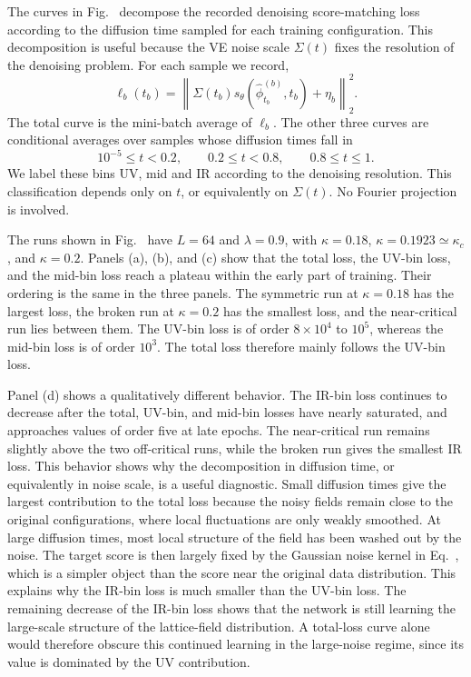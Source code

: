\documentclass[reprint,twocolumn,superscriptaddress,preprintnumbers,amsmath,amssymb,aps,prd,floatfix]{revtex4-2}
\def\Eq#1{Eq.~\labelcref{#1}} \def\Eqs#1{Eqs.~\labelcref{#1}}
\def\fig#1{Fig.~\labelcref{#1}} \def\Fig#1{Fig.~\labelcref{#1}} \def\figs#1#2{Figs.~\labelcref{#1} and \labelcref{#2}} \def\Figs#1#2{Figs.~\labelcref{#1} and \labelcref{#2}} \def\Tab#1{Tab.~\labelcref{#1}} \def\tab#1{Tab.~\labelcref{#1}} \def\Sec#1{Sec.~\labelcref{#1}}
\begin{document}
The curves in \fig{fig:loss_3d_L64} decompose the recorded denoising score-matching loss according to the diffusion time sampled for each training configuration.  This decomposition is useful because the VE noise scale $\Sigma(t)$ fixes the resolution of the denoising problem.  For each sample we record,
\begin{equation}
\ell_b(t_b)=
\left\|
\Sigma(t_b)s_\theta(\hat{\phi}^{(b)}_{t_b},t_b)+\eta_b
\right\|_2^2 .
\label{eq:per_sample_loss_app}
\end{equation}
The total curve is the mini-batch average of $\ell_b$.  The other three curves are conditional averages over samples whose diffusion times fall in
\begin{equation}
  10^{-5}\le t<0.2,
  \qquad
  0.2\le t<0.8,
  \qquad
  0.8\le t\le 1 .
\end{equation}
We label these bins UV, mid and IR according to the denoising resolution.  This classification depends only on $t$, or equivalently on $\Sigma(t)$.  No Fourier projection is involved.

The runs shown in \fig{fig:loss_3d_L64} have $L=64$ and $\lambda=0.9$, with $\kappa=0.18$, $\kappa=0.1923\simeq\kappa_c$, and $\kappa=0.2$.  Panels (a), (b), and (c) show that the total loss, the UV-bin loss, and the mid-bin loss reach a plateau within the early part of training.  Their ordering is the same in the three panels.  The symmetric run at $\kappa=0.18$ has the largest loss, the broken run at $\kappa=0.2$ has the smallest loss, and the near-critical run lies between them.  The UV-bin loss is of order $8\times 10^4$ to $10^5$, whereas the mid-bin loss is of order $10^3$.  The total loss therefore mainly follows the UV-bin loss.

Panel (d) shows a qualitatively different behavior.  The IR-bin loss continues to decrease after the total, UV-bin, and mid-bin losses have nearly saturated, and approaches values of order five at late epochs.  The near-critical run remains slightly above the two off-critical runs, while the broken run gives the smallest IR loss.  This behavior shows why the decomposition in diffusion time, or equivalently in noise scale, is a useful diagnostic.  Small diffusion times give the largest contribution to the total loss because the noisy fields remain close to the original configurations, where local fluctuations are only weakly smoothed.  At large diffusion times, most local structure of the field has been washed out by the noise.  The target score is then largely fixed by the Gaussian noise kernel in \Eq{eq:ve_sde_kernel}, which is a simpler object than the score near the original data distribution.  This explains why the IR-bin loss is much smaller than the UV-bin loss.  The remaining decrease of the IR-bin loss shows that the network is still learning the large-scale structure of the lattice-field distribution.  A total-loss curve alone would therefore obscure this continued learning in the large-noise regime, since its value is dominated by the UV contribution.
\end{document}

